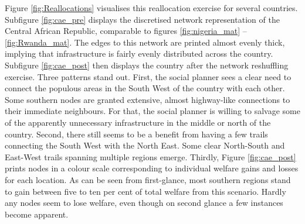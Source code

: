 \documentclass[11pt, oneside]{article}   	%
\begin{document}
Figure \eqref{fig:Reallocations} visualises this reallocation exercise for several countries. Subfigure \eqref{fig:cae_pre} displays the discretised network representation of the Central African Republic, comparable to figures \eqref{fig:nigeria_mat} -- \eqref{fig:Rwanda_mat}. The edges to this network are printed almost evenly thick, implying that infrastructure is fairly evenly distributed across the country. Subfigure \eqref{fig:cae_post} then displays the country after the network reshuffling exercise. Three patterns stand out. First, the social planner sees a clear need to connect the populous areas in the South West of the country with each other. Some southern nodes are granted extensive, almost highway-like connections to their immediate neighbours. For that, the social planner is willing to salvage some of the apparently unnecessary infrastructure in the middle or north of the country. Second, there still seems to be a benefit from having a few trails connecting the South West with the North East. Some clear North-South and East-West trails spanning multiple regions emerge. Thirdly, Figure \eqref{fig:cae_post} prints nodes in a colour scale corresponding to individual welfare gains and losses for each location. As can be seen from first-glance, most southern regions stand to gain between five to ten per cent of total welfare from this scenario. Hardly any nodes seem to lose welfare, even though on second glance a few instances become apparent.
\end{document}
